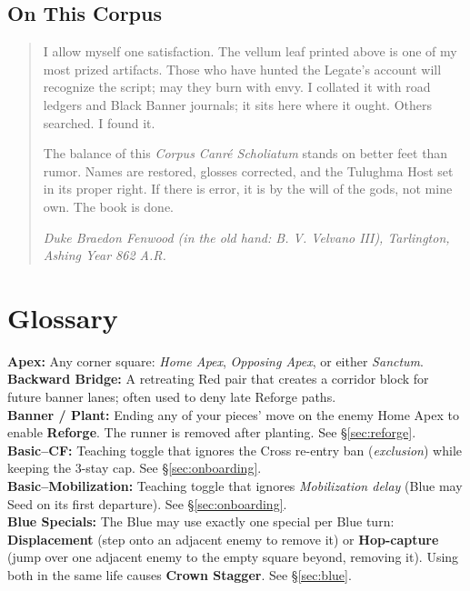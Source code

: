 \documentclass[11pt]{article}
\begin{document}
\subsection*{On This Corpus}
\begin{quote}\small
I allow myself one satisfaction. The vellum leaf printed above is one of my most prized artifacts. Those who have hunted the Legate's account will recognize the script; may they burn with envy. I collated it with road ledgers and Black Banner journals; it sits here where it ought. Others searched. I found it.

The balance of this \emph{Corpus Canré Scholiatum} stands on better feet than rumor. Names are restored, glosses corrected, and the Tulughma Host set in its proper right. If there is error, it is by the will of the gods, not mine own. The book is done.

\hfill\emph{Duke Braedon Fenwood (in the old hand: B. V. Velvano III), Tarlington, Ashing Year 862 A.R.}
\end{quote}

\clearpage
\section*{Glossary}
\label{sec:glossary}
{}

\textbf{Apex:} Any corner square: \emph{Home Apex}, \emph{Opposing Apex}, or either \emph{Sanctum}.\\

\textbf{Backward Bridge:} A retreating Red pair that creates a corridor block for future banner lanes; often used to deny late Reforge paths.\\

\textbf{Banner / Plant:} Ending any of your pieces' move on the enemy Home Apex to enable \textbf{Reforge}. The runner is removed after planting. See \S\ref{sec:reforge}.\\

\textbf{Basic--CF:} Teaching toggle that ignores the Cross re-entry ban (\emph{exclusion}) while keeping the 3-stay cap. See \S\ref{sec:onboarding}.\\

\textbf{Basic--Mobilization:} Teaching toggle that ignores \emph{Mobilization delay} (Blue may Seed on its first departure). See \S\ref{sec:onboarding}.\\

\textbf{Blue Specials:} The Blue may use exactly one special per Blue turn: \textbf{Displacement} (step onto an adjacent enemy to remove it) or \textbf{Hop-capture} (jump over one adjacent enemy to the empty square beyond, removing it). Using both in the same life causes \textbf{Crown Stagger}. See \S\ref{sec:blue}.\\
\end{document}
